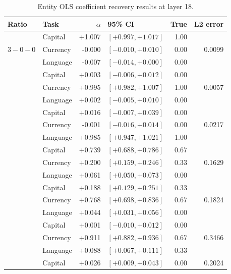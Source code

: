 \documentclass[11pt]{article}
\begin{document}
\begin{table}[H]
\centering
\scriptsize
\renewcommand{\arraystretch}{1.25}
\caption{Entity OLS coefficient recovery results at layer 18.}
\label{tab:ols_entity_results}
\begin{tabular}{llrlrr}
\toprule
\textbf{Ratio} & \textbf{Task} & \textbf{\(\alpha\)} & \textbf{95\% CI} & \textbf{True} & \textbf{L2 error} \\
\midrule
\multirow{3}{*}{\(3-0-0\)} & Capital & +1.007 & \([+0.997,+1.017]\) & 1.00 & \multirow{3}{*}{0.0099} \\
 & Currency & -0.000 & \([-0.010,+0.010]\) & 0.00 & \\
 & Language & -0.007 & \([-0.014,+0.000]\) & 0.00 & \\
\addlinespace
\multirow{3}{*}{\(0-3-0\)} & Capital & +0.003 & \([-0.006,+0.012]\) & 0.00 & \multirow{3}{*}{0.0057} \\
 & Currency & +0.995 & \([+0.982,+1.007]\) & 1.00 & \\
 & Language & +0.002 & \([-0.005,+0.010]\) & 0.00 & \\
\addlinespace
\multirow{3}{*}{\(0-0-3\)} & Capital & +0.016 & \([-0.007,+0.039]\) & 0.00 & \multirow{3}{*}{0.0217} \\
 & Currency & -0.001 & \([-0.016,+0.014]\) & 0.00 & \\
 & Language & +0.985 & \([+0.947,+1.021]\) & 1.00 & \\
\addlinespace
\multirow{3}{*}{\(2-1-0\)} & Capital & +0.739 & \([+0.688,+0.786]\) & 0.67 & \multirow{3}{*}{0.1629} \\
 & Currency & +0.200 & \([+0.159,+0.246]\) & 0.33 & \\
 & Language & +0.061 & \([+0.050,+0.073]\) & 0.00 & \\
\addlinespace
\multirow{3}{*}{\(1-2-0\)} & Capital & +0.188 & \([+0.129,+0.251]\) & 0.33 & \multirow{3}{*}{0.1824} \\
 & Currency & +0.768 & \([+0.698,+0.836]\) & 0.67 & \\
 & Language & +0.044 & \([+0.031,+0.056]\) & 0.00 & \\
\addlinespace
\multirow{3}{*}{\(0-2-1\)} & Capital & +0.001 & \([-0.010,+0.012]\) & 0.00 & \multirow{3}{*}{0.3466} \\
 & Currency & +0.911 & \([+0.882,+0.936]\) & 0.67 & \\
 & Language & +0.088 & \([+0.067,+0.111]\) & 0.33 & \\
\addlinespace
\multirow{3}{*}{\(0-1-2\)} & Capital & +0.026 & \([+0.009,+0.043]\) & 0.00 & \multirow{3}{*}{0.2024} \\

\end{tabular}
\end{table}
\end{document}
